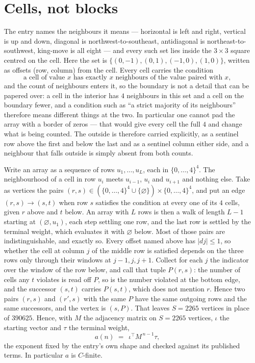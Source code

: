 \documentclass[11pt,a4paper]{article}
\theoremstyle{plain}
\theoremstyle{definition}
\begin{document}
\section{Cells, not blocks}

The entry names the neighbours it means --- horizontal is left and right, vertical is up and
down, diagonal is northwest-to-southeast, antidiagonal is northeast-to-southwest, king-move is
all eight --- and every such set lies inside the $3\times3$ square centred on the cell. Here
the set is $\{(0,-1), (0,1), (-1,0), (1,0)\}$, written as offsets (row, column) from the cell. Every cell carries
the condition
\[
\text{a cell of value }x\text{ has exactly }x\text{ neighbours of the value paired with }x,
\]
and the count of neighbours enters it, so the boundary is not a detail that can be papered
over: a cell in the interior has $4$ neighbours in this set and a cell on the boundary
fewer, and a condition such as ``a strict majority of its neighbours'' therefore means
different things at the two. In particular one cannot pad the array with a border of zeros ---
that would give every cell the full $4$ and change what is being counted. The outside is
therefore carried
explicitly, as a sentinel row above the first and below the last and as a sentinel column
either side, and a neighbour that falls outside is simply absent from both counts.

Write an array as a sequence of rows $u_1,\dots,u_L$, each in
$\{0,\dots,4\}^{4}$. The neighbourhood of a cell in row $u_i$ meets $u_{i-1}$,
$u_i$ and $u_{i+1}$ and nothing else. Take as vertices the pairs
$(r,s)\in(\{0,\dots,4\}^{4}\cup\{\varnothing\})\times\{0,\dots,4\}^{4}$,
and put an edge $(r,s)\to(s,t)$ when row $s$ satisfies the condition at every one of its
$4$ cells, given $r$ above and $t$ below. An array with $L$ rows is then a walk of length
$L-1$ starting at $(\varnothing,u_1)$, each step settling one row, and the last row is
settled by the terminal weight, which evaluates it with $\varnothing$ below. Most of those pairs are indistinguishable, and exactly so. Every offset named above has $|dj|\le 1$, so whether the cell at column $j$ of the middle row is satisfied depends on the three rows only through their windows at $j-1,j,j+1$. Collect for each $j$ the indicator over the window of the row below, and call that tuple $P(r,s)$: the number of cells any $t$ violates is read off $P$, so is the number violated at the bottom edge, and the successor $(s,t)$ carries $P(s,t)$, which does not mention $r$. Hence two pairs $(r,s)$ and $(r',s)$ with the same $P$ have the same outgoing rows and the same successors, and the vertex is $(s,P)$. That leaves $S=2265$ vertices in place of $390625$. Hence,
with $M$ the adjacency matrix on $S=2265$ vertices, $\iota$ the starting vector and $\tau$ the
terminal weight,
\[
a(n)\;=\;\,\iota^{\!\top}M^{\,n-1}\tau ,
\]
the exponent fixed by the entry's own shape and checked against its published terms. In
particular $a$ is $C$-finite.
\end{document}
